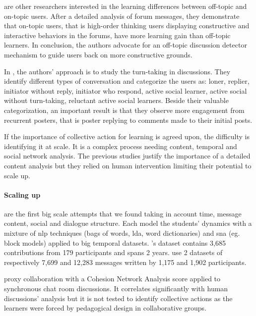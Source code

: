 \documentclass[a4paper,twoside]{article}
\begin{document}
\cite{Wang2016} are other researchers interested in the learning differences between off-topic and on-topic users.  After a detailed analysis of forum messages, they demonstrate that on-topic users, that is high-order thinking users displaying constructive and interactive behaviors in the forums, have more learning gain than off-topic learners.  In conclusion, the authors advocate for an off-topic discussion detector mechanism to guide users back on more constructive grounds.

In \citep{Chua2017}, the authors' approach is to study the turn-taking in discussions.  They identify different types of conversation and categorize the users as: loner, replier, initiator without reply, initiator who respond, active social learner, active social without turn-taking, reluctant active social learners.  Beside their valuable categorization, an important result is that they observe more engagement from recurrent posters, that is poster replying to comments made to their initial posts.

If the importance of collective action for learning is agreed upon, the difficulty is identifying it at scale.  It is a complex process needing content, temporal and social network analysis.  The previous studies justify the importance of a detailed content analysis but they relied on human intervention limiting their potential to scale up.

\paragraph{Scaling up}

\cite{Dascalu2017,Boroujeni2017} are the first big scale attempts that we found taking in account time, message content, social and dialogue structure.  Each model the students' dynamics with a mixture of \gls{nlp} techniques (bags of words, \gls{lda}, word dictionaries) and \gls{sna} (eg.  block models) applied to big temporal datasets.  \cite{Dascalu2017}'s dataset contains 3,685 contributions from 179 participants and spans 2 years.  \cite{Boroujeni2017} use 2 datasets of respectively 7,699 and 12,283 messages written by 1,175 and 1,902 participants.

\cite{Dascalu2017} proxy collaboration with a Cohesion Network Analysis score applied to synchronous chat room discussions.  It correlates significantly with human discussions' analysis but it is not tested to identify collective actions as the learners were forced by pedagogical design in collaborative groups.
\end{document}
